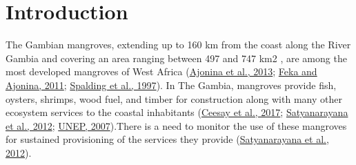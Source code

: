 \documentclass[utf8]{frontiersSCNS}
\begin{document}
\hypertarget{introduction}{%
\section*{Introduction}\label{introduction}}

The Gambian mangroves, extending up to 160 km from the coast along the
River Gambia and covering an area ranging between 497 and 747 km2 , are
among the most developed mangroves of West Africa
(\protect\hyperlink{ref-Ajonina-et-al-2013}{Ajonina et al., 2013};
\protect\hyperlink{ref-Feka-and-Ajonina-2011}{Feka and Ajonina, 2011};
\protect\hyperlink{ref-Spalding-et-al-1997}{Spalding et al., 1997}). In
The Gambia, mangroves provide fish, oysters, shrimps, wood fuel, and
timber for construction along with many other ecosystem services to the
coastal inhabitants (\protect\hyperlink{ref-Ceesay-et-al-2017}{Ceesay et
al., 2017};
\protect\hyperlink{ref-Satyanarayana-et-al-2012}{Satyanarayana et al.,
2012}; \protect\hyperlink{ref-UNEP-2007}{UNEP, 2007}).There is a need to
monitor the use of these mangroves for sustained provisioning of the
services they provide
(\protect\hyperlink{ref-Satyanarayana-et-al-2012}{Satyanarayana et al.,
2012}).
\end{document}
